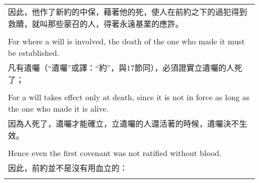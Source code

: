 \begin{tabularx}{\textwidth}{p{}}
因此，他作了新約的中保，藉著他的死，使人在前約之下的過犯得到救贖，就叫那些蒙召的人，得著永遠基業的應許。 \\ \\
For where a will is involved, the death of the one who made it must be established. \\
凡有遺囑（“遺囑”或譯：“約”，與17節同），必須證實立遺囑的人死了； \\ \\
For a will takes effect only at death, since it is not in force as long as the one who made it is alive. \\
因為人死了，遺囑才能確立，立遺囑的人還活著的時候，遺囑決不生效。 \\ \\
Hence even the first covenant was not ratified without blood. \\
因此，前約並不是沒有用血立的： \\ \\

\hline
\end{tabularx}

